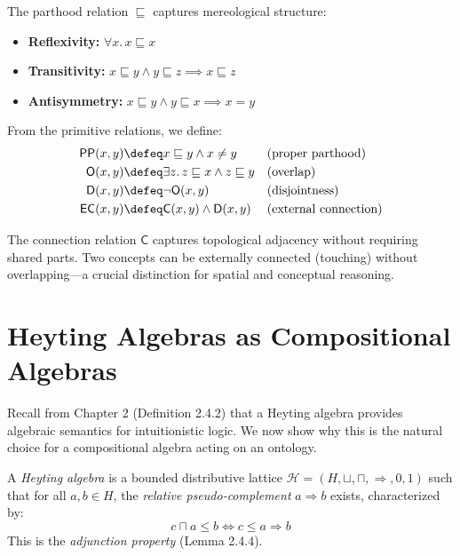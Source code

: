 \documentclass{itt-lean}
\begin{document}
The parthood relation $\sqsubseteq$ captures mereological structure:
\begin{itemize}
	\item \textbf{Reflexivity:} $\forall x.\, x \sqsubseteq x$
	\item \textbf{Transitivity:} $x \sqsubseteq y \land y \sqsubseteq z \implies x \sqsubseteq z$
	\item \textbf{Antisymmetry:} $x \sqsubseteq y \land y \sqsubseteq x \implies x = y$
\end{itemize}

\begin{definicao}
	From the primitive relations, we define:
	\begin{align*}
		\mathsf{PP}(x, y) &\defeq x \sqsubseteq y \land x \neq y && \text{(proper parthood)} \\
		\mathsf{O}(x, y) &\defeq \exists z.\, z \sqsubseteq x \land z \sqsubseteq y && \text{(overlap)} \\
		\mathsf{D}(x, y) &\defeq \neg \mathsf{O}(x, y) && \text{(disjointness)} \\
		\mathsf{EC}(x, y) &\defeq \mathsf{C}(x, y) \land \mathsf{D}(x, y) && \text{(external connection)}
	\end{align*}
\end{definicao}

\begin{observacao}
	The connection relation $\mathsf{C}$ captures topological adjacency without requiring shared parts. Two concepts can be externally connected (touching) without overlapping---a crucial distinction for spatial and conceptual reasoning.
\end{observacao}

\section{Heyting Algebras as Compositional Algebras}

Recall from Chapter 2 (Definition 2.4.2) that a Heyting algebra provides algebraic semantics for intuitionistic logic. We now show why this is the natural choice for a compositional algebra acting on an ontology.

\begin{definicao}
	A \emph{Heyting algebra} is a bounded distributive lattice $\mathcal{H} = (H, \sqcup, \sqcap, \Rightarrow, 0, 1)$ such that for all $a, b \in H$, the \emph{relative pseudo-complement} $a \Rightarrow b$ exists, characterized by:
	$$
	c \sqcap a \leq b \iff c \leq a \Rightarrow b
	$$
	This is the \emph{adjunction property} (Lemma 2.4.4).
\end{definicao}
\end{document}
